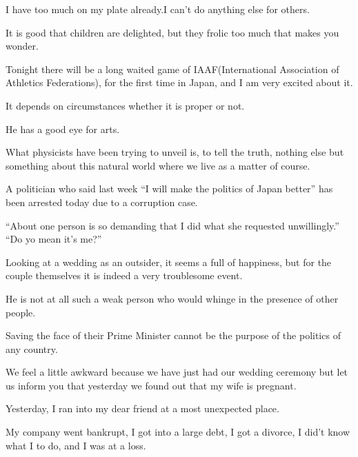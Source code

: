 \item[228.] I have too much on my plate already.I can't do anything else for others.
\item[229.] It is good that children are delighted, but they frolic too much that makes you wonder.
\item[230.] Tonight there will be a long waited game of IAAF(International Association of Athletics Federations), for the first time in Japan, and I am very excited about it.
\item[231.] It depends on circumstances whether it is proper or not.
\item[232.] He has a good eye for arts.
\item[233.] What physicists have been trying to unveil is, to tell the truth,  nothing else but something about this natural world where we live as a matter of course.
\item[234.] A politician who said last week ``I will make the politics of Japan better'' has been arrested today due to a corruption case.
\item[235.] ``About one person is so demanding that I did what she requested unwillingly.'' ``Do yo mean it's me?''
\item[236.] Looking at a wedding as an outsider, it seems a full of happiness, but for the couple themselves it is indeed a very troublesome event.
\item[237.] He is not at all such a weak person who would whinge in the presence of other people.
\item[238.] Saving the face of their Prime Minister cannot be the purpose of the politics of any country.
\item[239.] We feel a little awkward because we have just had our wedding ceremony but let us inform you that yesterday we found out that my wife is pregnant.
\item[240.] Yesterday, I ran into my dear friend at a most unexpected place.
\item[241.] My company went bankrupt, I got into a large debt, I got a divorce, I did't know what I to do, and I was at a loss.
